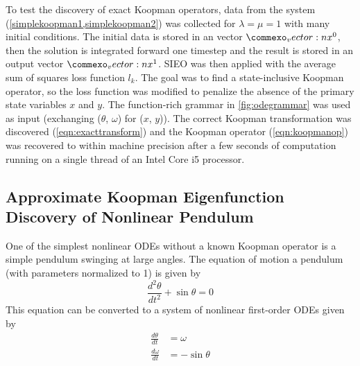 \documentclass{article}
\renewcommand{\vec}[1]{\vect{#1}}
\begin{document}
To test the discovery of exact Koopman operators, data from the system (\cref{simplekoopman1,simplekoopman2}) was collected for $\lambda = \mu = 1$ with many initial conditions. The initial data is stored in an vector $\vec{x}^0$, then the solution is integrated forward one timestep and the result is stored in an output vector $\vec{x}^1$. SIEO was then applied with the average sum of squares loss function $l_k$. The goal was to find a state-inclusive Koopman operator, so the loss function was modified to penalize the absence of the primary state variables $x$ and $y$. The function-rich grammar in \cref{fig:odegrammar} was used as input (exchanging ($\theta$, $\omega$) for ($x$, $y$)). The correct Koopman transformation was discovered (\cref{eqn:exacttransform}) and the Koopman operator (\cref{eqn:koopmanop}) was recovered to within machine precision after a few seconds of computation running on a single thread of an Intel Core i5 processor.


\subsection{Approximate Koopman Eigenfunction Discovery of Nonlinear Pendulum}
One of the simplest nonlinear ODEs without a known Koopman operator is a simple pendulum swinging at large angles. The equation of motion a pendulum (with parameters normalized to 1) is given by
\begin{equation}
\frac{d^2 \theta}{d t^2} + \sin \theta = 0 \end{equation}
This equation can be converted to a system of nonlinear first-order ODEs given by
\begin{align}
\frac{d\theta}{dt} &= \omega \\
\frac{d\omega}{dt} &= -\sin \theta
\end{align}
\end{document}

